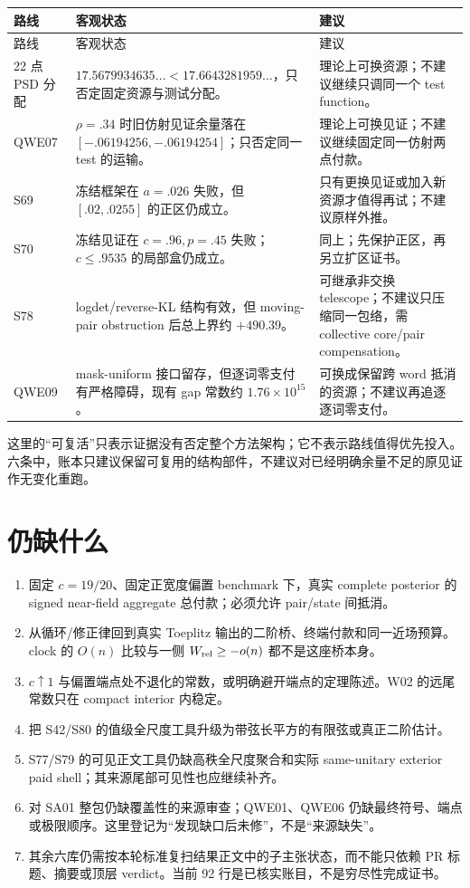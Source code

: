 \documentclass[UTF8,11pt]{ctexart}
\begin{document}
\begin{longtable}{p{1.8cm}p{5.1cm}p{7.3cm}}
\toprule
路线 & 客观状态 & 建议\\
\midrule
\endfirsthead
\toprule
路线 & 客观状态 & 建议\\
\midrule
\endhead
22 点 PSD 分配 & $17.5679934635\ldots<17.6643281959\ldots$，只否定固定资源与测试分配。 & 理论上可换资源；不建议继续只调同一个 test function。\\
QWE07 & $\rho=.34$ 时旧仿射见证余量落在 $[-.06194256,-.06194254]$；只否定同一 test 的运输。 & 理论上可换见证；不建议继续固定同一仿射两点付款。\\
S69 & 冻结框架在 $a=.026$ 失败，但 $[.02,.0255]$ 的正区仍成立。 & 只有更换见证或加入新资源才值得再试；不建议原样外推。\\
S70 & 冻结见证在 $c=.96,p=.45$ 失败；$c\le .9535$ 的局部盒仍成立。 & 同上；先保护正区，再另立扩区证书。\\
S78 & logdet/reverse-KL 结构有效，但 moving-pair obstruction 后总上界约 $+490.39$。 & 可继承非交换 telescope；不建议只压缩同一包络，需 collective core/pair compensation。\\
QWE09 & mask-uniform 接口留存，但逐词零支付有严格障碍，现有 gap 常数约 $1.76\times10^{15}$。 & 可换成保留跨 word 抵消的资源；不建议再追逐逐词零支付。\\
\bottomrule
\end{longtable}

这里的“可复活”只表示证据没有否定整个方法架构；它不表示路线值得优先投入。六条中，账本只建议保留可复用的结构部件，不建议对已经明确余量不足的原见证作无变化重跑。

\section{仍缺什么}

\begin{enumerate}
  \item 固定 $c=19/20$、固定正宽度偏置 benchmark 下，真实 complete posterior 的 signed near-field aggregate 总付款；必须允许 pair/state 间抵消。
  \item 从循环/修正律回到真实 Toeplitz 输出的二阶桥、终端付款和同一近场预算。clock 的 $O(n)$ 比较与一侧 $W_{\rm rel}\ge-o(n)$ 都不是这座桥本身。
  \item $c\uparrow1$ 与偏置端点处不退化的常数，或明确避开端点的定理陈述。W02 的远尾常数只在 compact interior 内稳定。
  \item 把 S42/S80 的值级全尺度工具升级为带弦长平方的有限弦或真正二阶估计。
  \item S77/S79 的可见正文工具仍缺高秩全尺度聚合和实际 same-unitary exterior paid shell；其来源尾部可见性也应继续补齐。
  \item 对 SA01 整包仍缺覆盖性的来源审查；QWE01、QWE06 仍缺最终符号、端点或极限顺序。这里登记为“发现缺口后未修”，不是“来源缺失”。
  \item 其余六库仍需按本轮标准复扫结果正文中的子主张状态，而不能只依赖 PR 标题、摘要或顶层 verdict。当前 92 行是已核实账目，不是穷尽性完成证书。
\end{enumerate}
\end{document}
